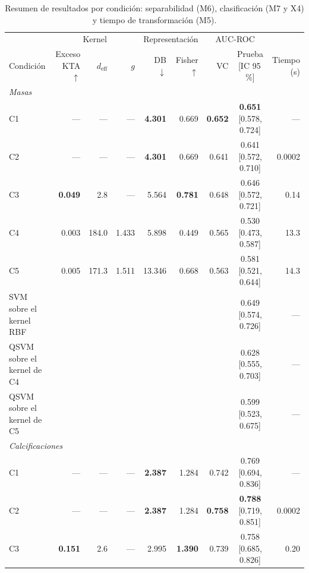 \begin{table}[H]
\centering
\small
\caption{Resumen de resultados por condición: separabilidad (M6), clasificación (M7 y X4) y tiempo de transformación (M5).}
\label{tab:resumen_resultados}
\begin{adjustbox}{max width=\linewidth}
\begin{tabular}{l r r r r r r c r}
\toprule
 & \multicolumn{3}{c}{Kernel} & \multicolumn{2}{c}{Representación} & \multicolumn{2}{c}{AUC-ROC} & \\ \cmidrule(lr){2-4}\cmidrule(lr){5-6}\cmidrule(lr){7-8}
Condición & Exceso KTA $\uparrow$ & $d_{\mathrm{eff}}$ & $g$ & DB $\downarrow$ & Fisher $\uparrow$ & VC & Prueba [IC 95\,\%] & Tiempo (s) \\
\midrule
\multicolumn{9}{l}{\textit{Masas}} \\
\quad C1 & — & — & — & \textbf{4.301} & 0.669 & \textbf{0.652} & \textbf{0.651} [0.578, 0.724] & — \\
\quad C2 & — & — & — & \textbf{4.301} & 0.669 & 0.641 & 0.641 [0.572, 0.710] & 0.0002 \\
\quad C3 & \textbf{0.049} & 2.8 & — & 5.564 & \textbf{0.781} & 0.648 & 0.646 [0.572, 0.721] & 0.14 \\
\quad C4 & 0.003 & 184.0 & 1.433 & 5.898 & 0.449 & 0.565 & 0.530 [0.473, 0.587] & 13.3 \\
\quad C5 & 0.005 & 171.3 & 1.511 & 13.346 & 0.668 & 0.563 & 0.581 [0.521, 0.644] & 14.3 \\
\quad SVM sobre el kernel RBF & \multicolumn{6}{c}{} & 0.649 [0.574, 0.726] & — \\
\quad QSVM sobre el kernel de C4 & \multicolumn{6}{c}{} & 0.628 [0.555, 0.703] & — \\
\quad QSVM sobre el kernel de C5 & \multicolumn{6}{c}{} & 0.599 [0.523, 0.675] & — \\
\multicolumn{9}{l}{\textit{Calcificaciones}} \\
\quad C1 & — & — & — & \textbf{2.387} & 1.284 & 0.742 & 0.769 [0.694, 0.836] & — \\
\quad C2 & — & — & — & \textbf{2.387} & 1.284 & \textbf{0.758} & \textbf{0.788} [0.719, 0.851] & 0.0002 \\
\quad C3 & \textbf{0.151} & 2.6 & — & 2.995 & \textbf{1.390} & 0.739 & 0.758 [0.685, 0.826] & 0.20 \\

\end{tabular}
\end{adjustbox}
\end{table}
